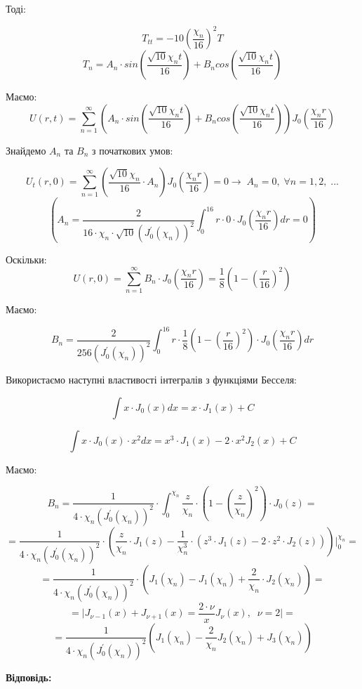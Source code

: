 \documentclass[]{article}
\begin{document}
Тоді:

\[T_{tt} = -10\left(\frac{\chi_n}{16}\right)^2T\]
\[T_n = A_n\cdot sin\left(\frac{\sqrt{10}\chi_n t}{16}\right)+ B_n cos\left(\frac{\sqrt{10}\chi_n t}{16}\right)\]

Маємо:
\[U(r,t) = \sum_{n=1}^{\infty}\left(A_n\cdot sin\left(\frac{\sqrt{10}\chi_n t}{16}\right)+ B_n cos\left(\frac{\sqrt{10}\chi_n t}{16}\right)\right) J_0\left(\frac{\chi_n r}{16}\right)\]

Знайдемо $A_n$ та $B_n$ з початкових умов:

\[U_t(r,0) = \sum_{n=1}^{\infty}\left(\frac{\sqrt{10}\chi_n}{16}\cdot A_n\right) J_0\left(\frac{\chi_n r}{16}\right) = 0\rightarrow\;A_{n} = 0, \;\forall n = 1,2,\;...\]
\[\left(A_n = \frac{2}{16\cdot \chi_n\cdot\sqrt{10}\left(J_0^{'}(\chi_n)\right)^2}\int_{0}^{16}r\cdot 0\cdot J_0\left(\frac{\chi_n r}{16}\right)dr = 0\right)\]

Оскільки:
\[U(r,0) = \sum_{n=1}^{\infty}B_n\cdot J_0\left(\frac{\chi_n r}{16}\right) = \frac{1}{8}\left(1-\left(\frac{r}{16}\right)^2\right)\]

\newpage

Маємо:

\[B_n = \frac{2}{256\left(J_0^{'}(\chi_n)\right)^2}\int_{0}^{16}r\cdot \frac{1}{8}\left(1-\left(\frac{r}{16}\right)^2\right)\cdot J_0\left(\frac{\chi_n r}{16}\right)dr\]

Використаємо наступні властивості інтегралів з функціями Бесселя:

\[\int x\cdot J_0(x) dx = x\cdot J_1(x) + C\]

\[\int x\cdot J_0(x)\cdot x^2 dx = x^3\cdot J_1(x) - 2\cdot x^2 J_2(x)+ C\]

Маємо:

\[B_n = \frac{1}{4\cdot\chi_n\left(J_0^{'}(\chi_n)\right)^2}\cdot\int_{0}^{\chi_n} \frac{z}{\chi_n}\cdot\left(1-\left(\frac{z}{\chi_n}\right)^2\right)\cdot J_0\left(z\right) = \]
\[ = \frac{1}{4\cdot\chi_n\left(J_0^{'}(\chi_n)\right)^2} \cdot \left(\frac{z}{\chi_n}\cdot J_1(z)-\frac{1}{\chi_n^3}\cdot\left(z^3\cdot J_1(z)-2\cdot z^2\cdot J_2(z)\right)\right)\big|_0^{\chi_n} = \]
\[ = \frac{1}{4\cdot\chi_n\left(J_0^{'}(\chi_n)\right)^2} \cdot \left( J_1(\chi_n) - J_1(\chi_n)+\frac{2}{\chi_n}\cdot J_2 (\chi_n)\right) = \]
\[ = \big| J_{\nu-1}(x)+J_{\nu+1}(x) = \frac{2\cdot\nu}{x}J_\nu(x),\;\;\nu=2 \big| =\]
\[= \frac{1}{4\cdot\chi_n\left(J_0^{'}(\chi_n)\right)^2}\left(J_1(\chi_n)-\frac{2}{\chi_n}J_2(\chi_n)+J_3(\chi_n)\right)\]

\textbf{Відповідь:}
\end{document}
